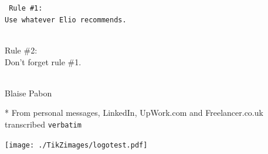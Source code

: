     \centerfleuron{\adfflatleafsolidleft}


    \vfill
    \begin{center}\LARGE\tt
        Rule \#1:\\
        Use whatever Elio recommends.\\
        \strut\\
        Rule \#2:\\
        Don't forget rule \#1.\\
        \strut\\
        \large Blaise Pabon
    \end{center}
    \vfill
    * From personal messages, LinkedIn, UpWork.com and Freelancer.co.uk transcribed \texttt{verbatim}

    \clearpage
    

    \clearpage
    \null
    \vfill
    \begin{center}
    \texttt{[image: ./TikZimages/logotest.pdf]}
    \end{center}
    \vfill
    \null

